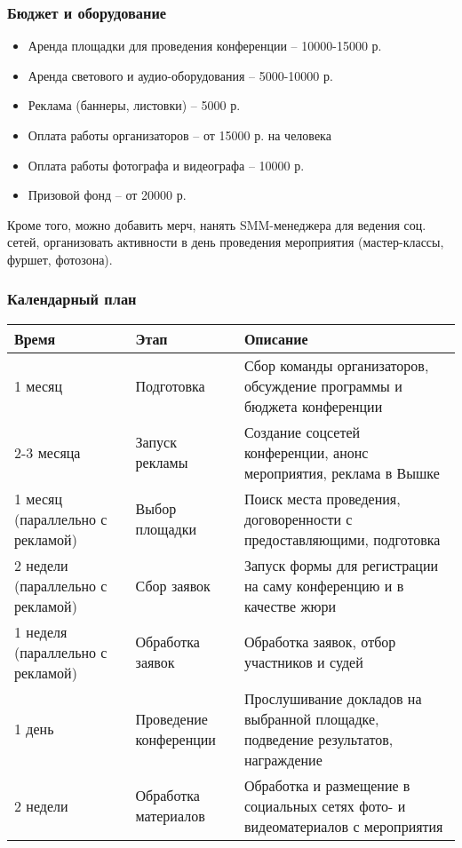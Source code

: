\documentclass[12pt]{article}
\begin{document}
\subsubsection*{Бюджет и оборудование}
\begin{itemize}
    \item Аренда площадки для проведения конференции -- 10000-15000 р.
    \item Аренда светового и аудио-оборудования -- 5000-10000 р.
    \item Реклама (баннеры, листовки) -- 5000 р.
    \item Оплата работы организаторов -- от 15000 р. на человека
    \item Оплата работы фотографа и видеографа -- 10000 р.
    \item Призовой фонд -- от 20000 р.
\end{itemize}
Кроме того, можно добавить мерч, нанять SMM-менеджера для ведения соц. сетей, организовать активности в день проведения мероприятия (мастер-классы, фуршет, фотозона).
\subsubsection*{Календарный план}
\begin{table}[h]
    \centering
    \begin{tabular}{|m{2.5 cm}|m{5 cm}|m{8 cm}|} \hline
        \textbf{Время} & \textbf{Этап} & \textbf{Описание} \\ \hline
        1 месяц & Подготовка & Сбор команды организаторов, обсуждение программы и бюджета конференции \\ \hline
        2-3 месяца & Запуск рекламы & Создание соцсетей конференции, анонс мероприятия, реклама в Вышке \\ \hline
        1 месяц (параллельно с рекламой) & Выбор площадки & Поиск места проведения, договоренности с предоставляющими, подготовка \\ \hline
        2 недели (параллельно с рекламой) & Сбор заявок & Запуск формы для регистрации на саму конференцию и в качестве жюри \\ \hline
        1 неделя (параллельно с рекламой) & Обработка заявок & Обработка заявок, отбор участников и судей \\ \hline
        1 день & Проведение конференции & Прослушивание докладов на выбранной площадке, подведение результатов, награждение \\ \hline
        2 недели & Обработка материалов & Обработка и размещение в социальных сетях фото- и видеоматериалов с мероприятия \\ \hline
    \end{tabular}
\end{table}
\end{document}
